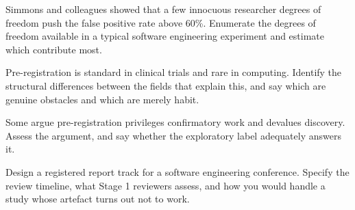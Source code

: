 \begin{reviewq}
  \item Simmons and colleagues showed that a few innocuous researcher degrees
    of freedom push the false positive rate above 60\%. Enumerate the degrees
    of freedom available in a typical software engineering experiment and
    estimate which contribute most.
  \item Pre-registration is standard in clinical trials and rare in computing.
    Identify the structural differences between the fields that explain this,
    and say which are genuine obstacles and which are merely habit.
  \item Some argue pre-registration privileges confirmatory work and devalues
    discovery. Assess the argument, and say whether the exploratory label
    adequately answers it.
  \item Design a registered report track for a software engineering conference.
    Specify the review timeline, what Stage 1 reviewers assess, and how you
    would handle a study whose artefact turns out not to work.
\end{reviewq}
